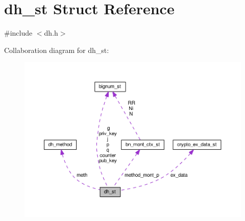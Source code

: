\hypertarget{structdh__st}{}\section{dh\+\_\+st Struct Reference}
\label{structdh__st}


{\ttfamily \#include $<$dh.\+h$>$}



Collaboration diagram for dh\+\_\+st\+:
\nopagebreak
\begin{figure}[H]
\begin{center}
\leavevmode
\includegraphics[width=350pt]{structdh__st__coll__graph}
\end{center}
\end{figure}
